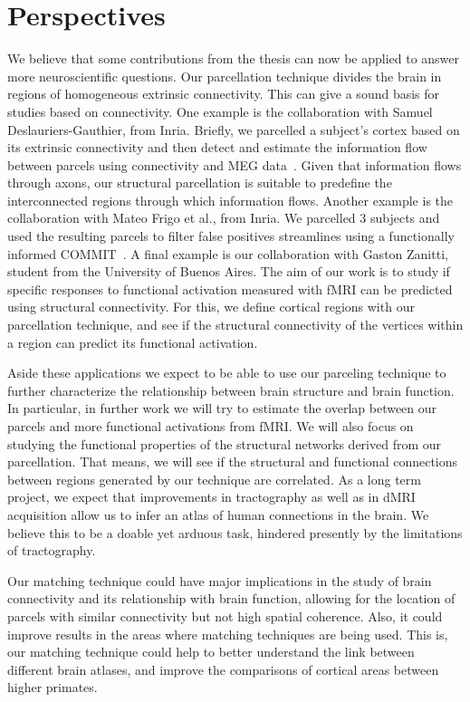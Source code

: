 \section{Perspectives}

We believe that some contributions from the thesis can now be applied
to answer more neuroscientific questions. Our parcellation technique divides
the brain in regions of homogeneous extrinsic connectivity. This can give
a sound basis for studies based on connectivity. One example is the collaboration
with Samuel Deslauriers-Gauthier, from Inria. Briefly, we parcelled a subject's
cortex based on its extrinsic connectivity and then detect and estimate the information
flow between parcels using connectivity and MEG data~\cite{Gallardo2017b}.
Given that information flows through axons, our structural parcellation is suitable to predefine the
interconnected regions through which information flows. Another example is the
collaboration with Mateo Frigo et al., from Inria. We parcelled 3 subjects
and used the resulting parcels to filter false positives streamlines using a
functionally informed COMMIT~\cite{Frigo2018}. A final example is our collaboration
with Gaston Zanitti, student from the University of Buenos Aires. The aim of
our work is to study if specific responses to functional activation measured
with fMRI can be predicted using structural connectivity. For this, we define
cortical regions with our parcellation technique, and see if the structural
connectivity of the vertices within a region can predict its functional activation.

Aside these applications we expect to be able to use our parceling technique to
further characterize the relationship between brain structure and brain function.
In particular, in further work we will try to estimate the overlap between
our parcels and more functional activations from fMRI. We will also focus on
studying the functional properties of the structural networks derived from
our parcellation. That means, we will see if the structural and functional
connections between regions generated by our technique are correlated. 
As a long term project, we expect that improvements in tractography as well as
in dMRI acquisition allow us to infer an atlas of human connections in the brain.
We believe this to be a doable yet arduous task, hindered presently by the
limitations of tractography.

Our matching technique could have major implications in the study of brain
connectivity and its relationship with brain function, allowing for the location
of parcels with similar connectivity but not high spatial coherence. Also, it
could improve results in the areas where matching techniques are
being used. This is, our matching technique could help to better understand
the link between different brain atlases, and improve the comparisons of cortical
areas between higher primates.

